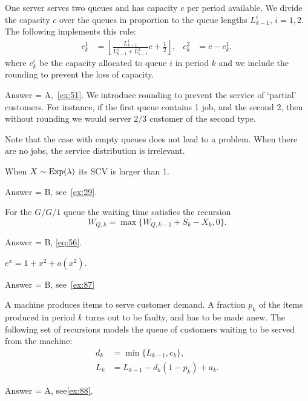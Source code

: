 \begin{exercise}[201904]
 One server serves two queues and has capacity $c$ per period available.
 We divide the capacity $c$ over the queues in proportion to the queue lengths $L^i_{k-1}$, $i=1,2$.
 The following implements this rule:
 \begin{align*}
 c_k^1 &= \left\lfloor \frac{L_{k-1}^1}{L_{k-1}^1 + L_{k-1}^2} c + \frac 1 2 \right\rfloor, & c_k^2 &= c - c_k^1,
 \end{align*}
 where $c_k^i$ be the capacity allocated to queue $i$ in period $k$ and we include the rounding to prevent the loss of capacity.

\begin{solution}
 Answer = A,~\cref{ex:51}.
 We introduce rounding to prevent the service of `partial' customers.
 For instance, if the first queue contains 1 job, and the second 2, then without rounding we would server $2/3$ customer of the second type.

 Note that the case with empty queues does not lead to a problem.
 When there are no jobs, the service distribution is irrelevant.
\end{solution}
\end{exercise}


\begin{exercise}[201904]
When $X\sim\operatorname{Exp}(\lambda)$ its SCV is larger than 1.
\begin{solution} Answer = B, see~\cref{ex:29}.
\end{solution}
\end{exercise}

\begin{exercise}[201904]
 For the $G/G/1$ queue the waiting time satisfies the recursion
 \begin{equation*}
 W_{Q,k} = \max\{W_{Q,k-1} + S_{k}-X_k, 0\}.
 \end{equation*}
\begin{solution} Answer = B, \eqref{eq:56}.
\end{solution}
\end{exercise}


\begin{exercise}[201907]
$e^{x} = 1 +x^2 + o(x^2)$.
\begin{solution}
Answer = B, see~\cref{ex:87}
\end{solution}
\end{exercise}

\begin{exercise}[201907]
 A machine produces items to serve customer demand.
 A fraction $p_k$ of the items produced in period $k$ turns out to be faulty, and has to be made anew.
 The following set of recursions models the queue of customers waiting to be served from the machine:
 \begin{align*}
 d_k &= \min\{L_{k-1}, c_k\}, \\
 L_k &= L_{k-1}-d_k(1-p_k) + a_k.
 \end{align*}
\begin{solution}
Answer = A, see\cref{ex:88}.
\end{solution}
\end{exercise}

